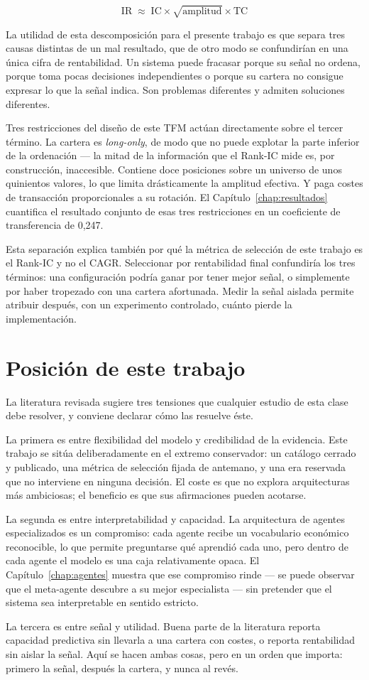 \[
  \text{IR} \;\approx\; \text{IC} \times \sqrt{\text{amplitud}} \times \text{TC}
\]

La utilidad de esta descomposición para el presente trabajo es que separa tres causas distintas de
un mal resultado, que de otro modo se confundirían en una única cifra de rentabilidad. Un sistema
puede fracasar porque su señal no ordena, porque toma pocas decisiones independientes o porque su
cartera no consigue expresar lo que la señal indica. Son problemas diferentes y admiten soluciones
diferentes.

Tres restricciones del diseño de este TFM actúan directamente sobre el tercer término. La cartera es
\textit{long-only}, de modo que no puede explotar la parte inferior de la ordenación --- la mitad de
la información que el Rank-IC mide es, por construcción, inaccesible. Contiene doce posiciones sobre
un universo de unos quinientos valores, lo que limita drásticamente la amplitud efectiva. Y paga
costes de transacción proporcionales a su rotación. El Capítulo~\ref{chap:resultados} cuantifica el
resultado conjunto de esas tres restricciones en un coeficiente de transferencia de 0,247.

Esta separación explica también por qué la métrica de selección de este trabajo es el Rank-IC y no
el CAGR. Seleccionar por rentabilidad final confundiría los tres términos: una configuración podría
ganar por tener mejor señal, o simplemente por haber tropezado con una cartera afortunada. Medir la
señal aislada permite atribuir después, con un experimento controlado, cuánto pierde la
implementación.

\section{Posición de este trabajo}

La literatura revisada sugiere tres tensiones que cualquier estudio de esta clase debe resolver, y
conviene declarar cómo las resuelve éste.

La primera es entre flexibilidad del modelo y credibilidad de la evidencia. Este trabajo se sitúa
deliberadamente en el extremo conservador: un catálogo cerrado y publicado, una métrica de selección
fijada de antemano, y una era reservada que no interviene en ninguna decisión. El coste es que no
explora arquitecturas más ambiciosas; el beneficio es que sus afirmaciones pueden acotarse.

La segunda es entre interpretabilidad y capacidad. La arquitectura de agentes especializados es un
compromiso: cada agente recibe un vocabulario económico reconocible, lo que permite preguntarse qué
aprendió cada uno, pero dentro de cada agente el modelo es una caja relativamente opaca. El
Capítulo~\ref{chap:agentes} muestra que ese compromiso rinde --- se puede observar que el
meta-agente descubre a su mejor especialista --- sin pretender que el sistema sea interpretable en
sentido estricto.

La tercera es entre señal y utilidad. Buena parte de la literatura reporta capacidad predictiva sin
llevarla a una cartera con costes, o reporta rentabilidad sin aislar la señal. Aquí se hacen ambas
cosas, pero en un orden que importa: primero la señal, después la cartera, y nunca al revés.
